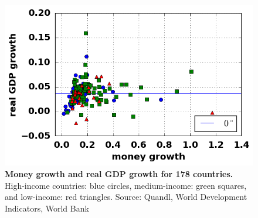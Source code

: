 \begin{figure}[h]
\caption{\label{fig_inflationGDP} \textbf{Money growth and real GDP growth for 178 countries.} High-income countries: blue circles, medium-income: green squares, and low-income: red triangles. {\tiny Source: Quandl, World Development Indicators, World Bank}}
\hspace*{-.5cm}\includegraphics[height = 7.cm]{fig_moneyGDP.png}
\end{figure}
